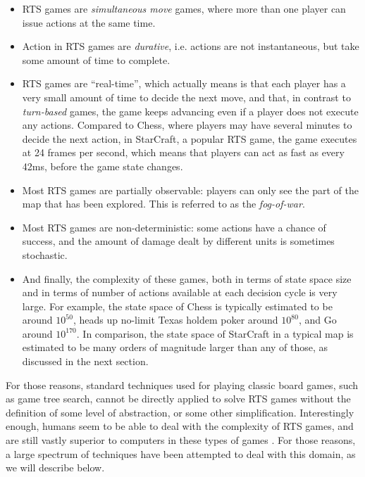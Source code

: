 \documentclass{llncs}
\begin{document}
\begin{itemize}
\item  RTS games are  {\em simultaneous  move} games,  where more than one
  player  can issue  actions  at the  same  time. 
\item Action in RTS games are {\em durative}, i.e.  actions are not instantaneous, but
  take some amount of time to complete.
\item RTS games  are ``real-time'', which actually means is that each
  player  has  a  very  small  amount  of  time  to  decide  the  next
  move, and that, in contrast to {\em turn-based} games, the game keeps advancing even if a player does not execute any actions. Compared to  Chess, where players may have several minutes to
  decide the next action, in StarCraft, a popular RTS game, the game executes at 24 frames
  per second, which means that players  can act as fast as every 42ms,
  before the game state changes.
\item Most  RTS games are  partially observable: players can  only see
  the part of the  map that has been explored. This  is referred to as
  the {\em fog-of-war}.
\item Most RTS games are non-deterministic: some actions have a chance
  of success, and the amount of damage dealt by different units is sometimes stochastic.
\item And  finally, the complexity  of these  games, both in  terms of
  state space size and in terms of number of actions available at each
  decision cycle is very large. For  example, the state space of Chess
  is typically  estimated to  be around  $10^{50}$, heads  up no-limit
  Texas holdem  poker around $10^{80}$,  and Go around  $10^{170}$. In
  comparison,  the  state space  of  StarCraft  in  a typical  map  is
  estimated to be  many orders of magnitude larger than  any of those,
  as discussed in the next section.
\end{itemize}

For those reasons, standard techniques  used for playing classic board
games, such as  game tree search, cannot be directly  applied to solve
RTS games without the definition of some level of abstraction, or some
other simplification. Interestingly enough, humans  seem to be able to
deal with the  complexity of RTS games, and are  still vastly superior
to       computers      in       these       types      of       games
\cite{burochurchill2012aimagazine}.   For  those   reasons,  a   large
spectrum of techniques  have been attempted to deal  with this domain,
as we will describe below. 
\end{document}
